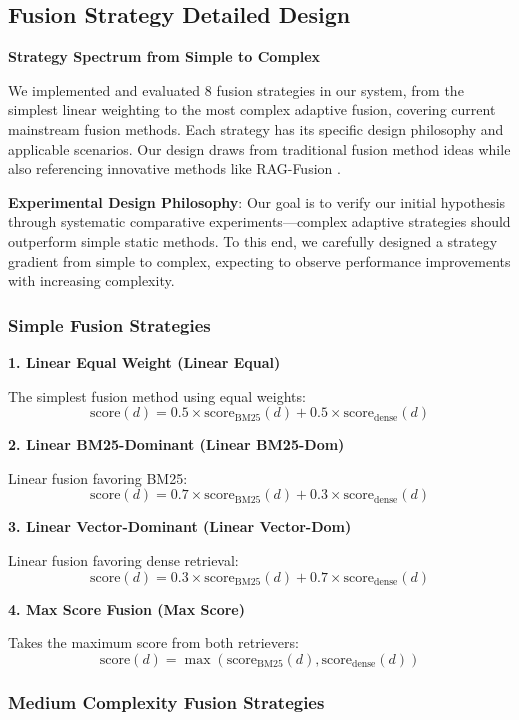 \documentclass[letterpaper]{article} %
\begin{document}
\subsection{Fusion Strategy Detailed Design}

\textbf{Strategy Spectrum from Simple to Complex}

We implemented and evaluated 8 fusion strategies in our system, from the simplest linear weighting to the most complex adaptive fusion, covering current mainstream fusion methods. Each strategy has its specific design philosophy and applicable scenarios. Our design draws from traditional fusion method ideas while also referencing innovative methods like RAG-Fusion \cite{rackauckas2024rag}.

\textbf{Experimental Design Philosophy}: Our goal is to verify our initial hypothesis through systematic comparative experiments—complex adaptive strategies should outperform simple static methods. To this end, we carefully designed a strategy gradient from simple to complex, expecting to observe performance improvements with increasing complexity.

\subsubsection{Simple Fusion Strategies}

\textbf{1. Linear Equal Weight (Linear Equal)}

The simplest fusion method using equal weights:
$$\text{score}(d) = 0.5 \times \text{score}_{\text{BM25}}(d) + 0.5 \times \text{score}_{\text{dense}}(d)$$

\textbf{2. Linear BM25-Dominant (Linear BM25-Dom)}

Linear fusion favoring BM25:
$$\text{score}(d) = 0.7 \times \text{score}_{\text{BM25}}(d) + 0.3 \times \text{score}_{\text{dense}}(d)$$

\textbf{3. Linear Vector-Dominant (Linear Vector-Dom)}

Linear fusion favoring dense retrieval:
$$\text{score}(d) = 0.3 \times \text{score}_{\text{BM25}}(d) + 0.7 \times \text{score}_{\text{dense}}(d)$$

\textbf{4. Max Score Fusion (Max Score)}

Takes the maximum score from both retrievers:
$$\text{score}(d) = \max(\text{score}_{\text{BM25}}(d), \text{score}_{\text{dense}}(d))$$

\subsubsection{Medium Complexity Fusion Strategies}
\end{document}
